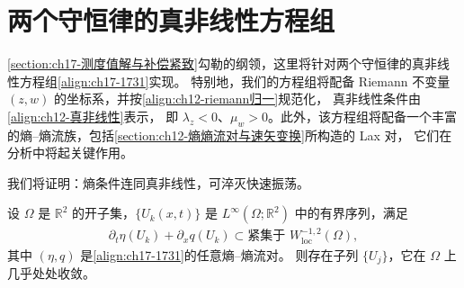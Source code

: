 \documentclass[../../main.tex]{subfiles}
\begin{document}
\section{两个守恒律的真非线性方程组}\label{section:ch17-两律真非线性}

\cref{section:ch17-测度值解与补偿紧致}勾勒的纲领，这里将针对两个守恒律的真非线性方程组\eqref{align:ch17-1731}实现。
特别地，我们的方程组将配备 Riemann 不变量 $(z,w)$ 的坐标系，并按\eqref{align:ch12-riemann归一}规范化，
真非线性条件由\eqref{align:ch12-真非线性}表示，
即 $\lambda_z<0$、$\mu_w>0$。此外，该方程组将配备一个丰富的熵--熵流族，包括\cref{section:ch12-熵熵流对与速矢变换}所构造的 Lax 对，
它们在分析中将起关键作用。

我们将证明：熵条件连同真非线性，可淬灭快速振荡。

\begin{theorem}[两律真非线性的补偿紧致性]\label{theorem:ch17-两律真非线性补偿紧致}
设 $\Omega$ 是 $\mathbb{R}^2$ 的开子集，$\{U_k(x,t)\}$ 是 $L^\infty(\Omega;\mathbb{R}^2)$ 中的有界序列，满足
\begin{align}
\partial_t\eta(U_k)+\partial_x q(U_k)\subset\text{紧集于 }W^{-1,2}_{\mathrm{loc}}(\Omega),
\label{align:ch17-1761}
\end{align}
其中 $(\eta,q)$ 是\eqref{align:ch17-1731}的任意熵--熵流对。%
则存在子列 $\{U_j\}$，它在 $\Omega$ 上几乎处处收敛。
\end{theorem}
\end{document}
